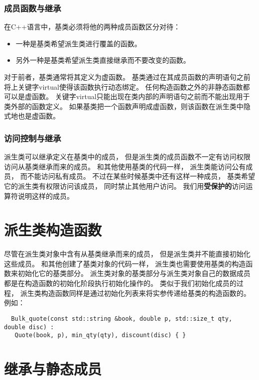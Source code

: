 \subsubsection{成员函数与继承}
在C++语言中，基类必须将他的两种成员函数区分对待：
\begin{itemize}
\item{一种是基类希望派生类进行覆盖的函数。}
\item{另外一种是基类希望派生类直接继承而不要改变的函数。}
\end{itemize}
对于前者，基类通常将其定义为虚函数。%
基类通过在其成员函数的声明语句之前将上关键字virtual使得该函数执行动态绑定。%
任何构造函数之外的非静态函数都可以是虚函数。
{\color{red}关键字virtual只能出现在类内部的声明语句之前而不能出现用于类外部的函数定义。%
  如果基类把一个函数声明成虚函数，则该函数在派生类中隐式地也是虚函数。%
}
\subsubsection{访问控制与继承}
派生类可以继承定义在基类中的成员，%
但是派生类的成员函数不一定有访问权限访问从基类继承而来的成员。%
和其他使用基类的代码一样，%
派生类能访问公有成员，%
而不能访问私有成员。%
不过在某些时候基类中还有这样一种成员，%
基类希望它的派生类有权限访问该成员，%
同时禁止其他用户访问。%
我们用{\bfseries{受保护的}}访问运算符说明这样的成员。

\section{派生类构造函数}
尽管在派生类对象中含有从基类继承而来的成员，%
但是派生类并不能直接初始化这些成员。%
和其他创建了基类对象的代码一样，%
派生类也需要使用基类的构造函数来初始化它的基类部分。
派生类对象的基类部分与派生类对象自己的数据成员都是在构造函数的初始化阶段执行初始化操作的。%
类似于我们初始化成员的过程，%
派生类构造函数同样是通过初始化列表来将实参传递给基类的构造函数的。%
例如：
\begin{lstlisting}
  Bulk_quote(const std::string &book, double p, std::size_t qty, double disc) :
   Quote(book, p), min_qty(qty), discount(disc) { }
\end{lstlisting}
{\color{red}{首先初始化基类的部分，然后按照声明的顺序依次来初始化派生类的成员。}}

\section{继承与静态成员}

